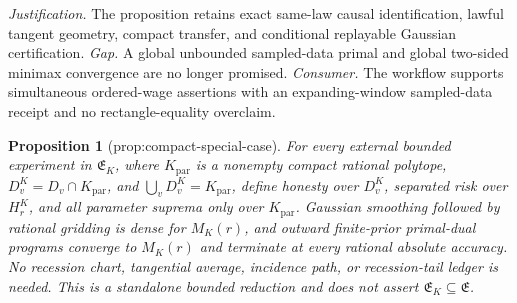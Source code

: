 \documentclass{article}
\newtheorem{proposition}{Proposition}
\begin{document}
\par\smallskip\noindent \textit{Justification.} The proposition retains exact same-law causal identification, lawful tangent geometry, compact transfer, and conditional replayable Gaussian certification. \textit{Gap.} A global unbounded sampled-data primal and global two-sided minimax convergence are no longer promised. \textit{Consumer.} The workflow supports simultaneous ordered-wage assertions with an expanding-window sampled-data receipt and no rectangle-equality overclaim.

\begin{proposition}[prop:compact-special-case]\label{prop:compact-special-case}
For every external bounded experiment in \(\mathfrak E_K\), where \(K_{\mathrm{par}}\) is a nonempty compact rational polytope, \(D_v^K=D_v\cap K_{\mathrm{par}}\), and \(\bigcup_vD_v^K=K_{\mathrm{par}}\), define honesty over \(D_v^K\), separated risk over \(H_r^K\), and all parameter suprema only over \(K_{\mathrm{par}}\). Gaussian smoothing followed by rational gridding is dense for \(M_K(r)\), and outward finite-prior primal-dual programs converge to \(M_K(r)\) and terminate at every rational absolute accuracy. No recession chart, tangential average, incidence path, or recession-tail ledger is needed. This is a standalone bounded reduction and does not assert \(\mathfrak E_K\subseteq\mathfrak E\).
\end{proposition}
\end{document}
